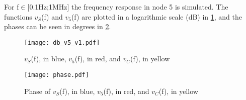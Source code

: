 For f$\in$[0.1Hz;1MHz] the frequency response in node 5 is simulated. The functions $v_S$(f) and $v_5$(f) are plotted in a logarithmic scale (dB) in \ref{fig:db_v5_v1.pdf}, and the phases can be seen in degrees in \ref{fig:phase.pdf}. 

\begin{figure}[h] \centering
\texttt{[image: db\_v5\_v1.pdf]}
\caption{$v_S$(f), in blue, $v_5$(f), in red, and $v_C$(f), in yellow}
\label{fig:db_v5_v1.pdf}
\end{figure}
\FloatBarrier

\begin{figure}[h] \centering
\texttt{[image: phase.pdf]}
\caption{Phase of $v_S$(f), in blue, $v_5$(f), in red, and $v_C$(f), in yellow}
\label{fig:phase.pdf}
\end{figure}
\FloatBarrier
